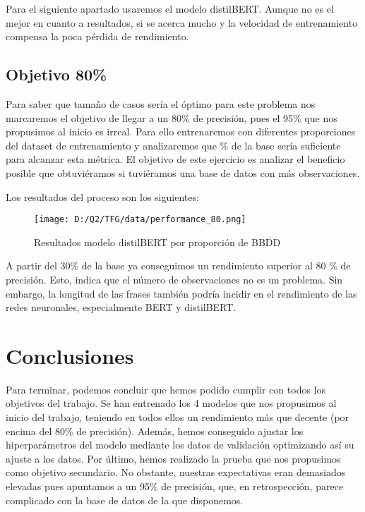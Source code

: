 \documentclass[10pt,riqno,a4paper,twoside]{article}\usepackage[]{graphicx}\usepackage[]{color}
\begin{document}
Para el siguiente apartado usaremos el modelo distilBERT. Aunque no es el mejor en cuanto a resultados, si se acerca mucho y la velocidad de entrenamiento compensa la poca pérdida de rendimiento. 


\subsection{Objetivo 80\%}

Para saber que tamaño de casos sería el óptimo para este problema nos marcaremos el objetivo de llegar a un 80\% de precisión, pues el 95\% que nos propusimos al inicio es irreal. Para ello entrenaremos con diferentes proporciones del dataset de entrenamiento y analizaremos que \% de la base sería suficiente para alcanzar esta métrica. El objetivo de este ejercicio es analizar el beneficio posible que obtuviéramos si tuviéramos una base de datos con más observaciones.   

Los resultados del proceso son los siguientes:

\begin{figure}[h]
\caption{Resultados modelo distilBERT por proporción de BBDD}
\begin{center}
\texttt{[image: D:/Q2/TFG/data/performance\_80.png]}
\end{center}
\end{figure}

A partir del 30\% de la base ya conseguimos un rendimiento superior al 80 \% de precisión. Esto, indica que el número de observaciones no es un problema. Sin embargo, la longitud de las frases también podría incidir en el rendimiento de las redes neuronales, especialmente BERT y distilBERT. 

\clearpage

\section{Conclusiones}

Para terminar, podemos concluir que hemos podido cumplir con todos los objetivos del trabajo. Se han entrenado los 4 modelos que nos propusimos al inicio del trabajo, teniendo en todos ellos un rendimiento más que decente (por encima del 80\% de precisión). Además, hemos conseguido ajustar los hiperparámetros del modelo mediante los datos de validación optimizando así su ajuste a los datos. Por último, hemos realizado la prueba que nos propusimos como objetivo secundario. No obstante, nuestras expectativas eran demasiados elevadas pues apuntamos a un 95\% de precisión, que, en retrospección, parece complicado con la base de datos de la que disponemos.\\ 
\end{document}
